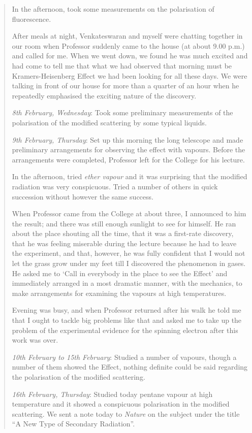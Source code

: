 \begin{quote}
{In the afternoon, took some measurements on the
polarisation of fluorescence.

After meals at night, Venkateswaran and myself were
chatting together in our room when Professor suddenly came to
the house (at about 9.00 p.m.) and called for me. When we went
down, we found he was much excited and had come to tell me
that what we had observed that morning must be Kramers-Heisenberg 
Effect we had been looking for all these days. We were
talking in front of our house for more than a quarter of an hour
when he repeatedly emphasised the exciting nature of
the discovery.

{\em 8th February, Wednesday}: Took some preliminary
measurements of the polarisation of the modified scattering by
some typical liquids.

{\em 9th February, Thursday}: Set up this morning the long
telescope and made preliminary arrangements for observing the
effect with vapours. Before the arrangements were completed,
Professor left for the College for his lecture.

In the afternoon, tried {\em ether vapour} and it was surprising that
the modified radiation was very conspicuous. Tried a number of
others in quick succession without however the same success.

When Professor came from the College at about three,
I announced to him the result; and there was still enough sunlight
to see for himself. He ran about the place shouting all the time,
that it was a first-rate discovery, that he was feeling miserable
during the lecture because he had to leave the experiment, and
that, however, he was fully confident that I would not let the grass
grow under my feet till I discovered the phenomenon in gases.
He asked me to `Call in everybody in the place to see the Effect'
and immediately arranged in a most dramatic manner, with the
mechanics, to make arrangements for examining the vapours at
high temperatures.

Evening was busy, and when Professor returned after his
walk he told me that I ought to tackle big problems like that and
asked me to take up the problem of the experimental evidence
for the spinning electron after this work was over.

{\em 10th February to 15th February}: Studied a number of
vapo\-urs, though a number of them showed the Effect, nothing
definite could be said regarding the polarisation of the modified
scattering.

{\em 16th February, Thursday}: Studied today pentane vapour at
high temperature and it showed a conspicuous polarisation in the
modified scattering. We sent a note today to {\em Nature} on the subject
under the title ``A New Type of Secondary Radiation''.

}
\end{quote}
